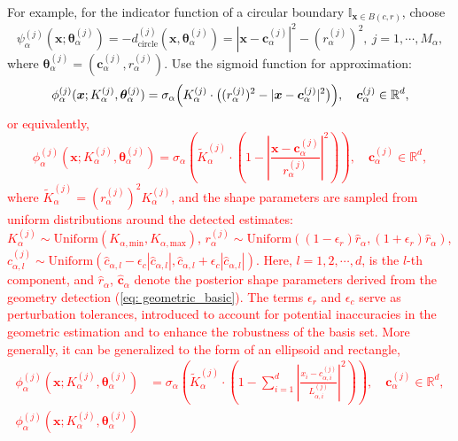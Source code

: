 \documentclass{article}
\newcommand{\red}[1]{\textcolor{red}{#1}}
\theoremstyle{plain}
\theoremstyle{definition}
\newcounter{example}[section]         %
\begin{document}
 {For example,  for the indicator function of a circular boundary $\mathbb{I}_{\boldsymbol{x} \in B(c, r)}$,  choose 
$$\psi_\alpha^{(j)}(\boldsymbol{x};\boldsymbol{\theta}_\alpha^{(j)}) = -d_{\text{circle}}^{(j)}(\boldsymbol{x},\boldsymbol{\theta}_\alpha^{(j)}) = |\boldsymbol{x} - \boldsymbol{c}_\alpha^{(j)}|^2 - (r_\alpha^{(j)})^2,\ j=1,\cdots,M_\alpha,$$
where $\boldsymbol{\theta}_\alpha^{(j)}=(\boldsymbol{c}_\alpha^{(j)},r_\alpha^{(j)})$. Use the sigmoid function for approximation: 
$$\phi_\alpha^{(j)}(\boldsymbol{x};K_\alpha^{(j)},\boldsymbol{\theta}_\alpha^{(j)}) = \sigma_\alpha\Bigl(K_\alpha^{(j)} \cdot \bigl((r_\alpha^{(j)})^2 - |\boldsymbol{x} - \boldsymbol{c}_\alpha^{(j)}|^2\bigr)\Bigr),  \quad \boldsymbol{c}_\alpha^{(j)}\in \mathbb{R}^d ,$$
\red{or equivalently, 
$$\phi_\alpha^{(j)}(\boldsymbol{x};K_\alpha^{(j)},\boldsymbol{\theta}_\alpha^{(j)}) = \sigma_\alpha\left(\tilde{K}_\alpha^{(j)} \cdot \left(1- \left|\frac{\boldsymbol{x} - \boldsymbol{c}_\alpha^{(j)}}{r_\alpha^{(j)}}\right|^2\right)\right),  \quad \boldsymbol{c}_\alpha^{(j)}\in \mathbb{R}^d ,$$
where $\tilde{K}_{\alpha}^{(j)}=(r^{(j)}_{\alpha})^2K_{\alpha}^{(j)}$, and the shape parameters are sampled from uniform distributions around the detected estimates:
$K_\alpha^{(j)} \sim \text{Uniform}(K_{\alpha, \text{min}}, K_{\alpha, \text{max}})$, 
$r_\alpha^{(j)} \sim \text{Uniform}\left((1-\epsilon_r)\hat{r}_{\alpha}, (1+\epsilon_r)\hat{r}_{\alpha}\right)$, \\ 
$c_{\alpha,l}^{(j)} \sim \text{Uniform}\left(\hat{c}_{\alpha,l} - \epsilon_c |\hat{c}_{\alpha,l}|, \hat{c}_{\alpha,l} + \epsilon_c |\hat{c}_{\alpha,l}|\right)$.
Here, $l=1,2,\cdots,d$, is the $l$-th component, and $\hat{r}_\alpha$, $\hat{\boldsymbol{c}}_\alpha$ denote the posterior shape parameters derived from the geometry detection (\ref{eq: geometric_basic}). The terms $\epsilon_r$ and $\epsilon_c$ serve as perturbation tolerances, introduced to account for potential inaccuracies in the geometric estimation and to enhance the robustness of the basis set. More generally, it can be generalized to the form of an ellipsoid and rectangle,
\begin{align}
    \label{ellip}
    \phi_\alpha^{(j)}(\boldsymbol{x};K_\alpha^{(j)},\boldsymbol{\theta}_\alpha^{(j)}) &= \sigma_\alpha\left(\tilde{K}_\alpha^{(j)} \cdot \left(1- \sum_{i=1}^d\left|\frac{x_i - c_{\alpha,i}^{(j)}}{L_{\alpha,i}^{(j)}}\right|^2\right)\right),  \quad \boldsymbol{c}_\alpha^{(j)}\in \mathbb{R}^d ,\\
    \label{rec}
    \phi_\alpha^{(j)}(\boldsymbol{x};K_\alpha^{(j)},\boldsymbol{\theta}_\alpha^{(j)})

\end{align}}}
\end{document}
